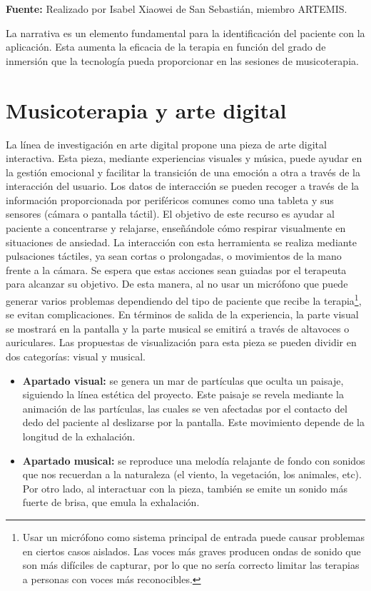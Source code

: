 \begin{center}
	\textbf{Fuente:} Realizado por Isabel Xiaowei de San Sebastián, miembro ARTEMIS.
\end{center}

La narrativa es un elemento fundamental para la identificación del paciente con la aplicación. Esta aumenta la eficacia de la terapia en función del grado de inmersión que la tecnología pueda proporcionar en las sesiones de musicoterapia.

\section{Musicoterapia y arte digital}

La línea de investigación en arte digital propone una pieza de arte digital interactiva. Esta pieza, mediante experiencias visuales y música, puede ayudar en la gestión emocional y facilitar la transición de una emoción a otra a través de la interacción del usuario. Los datos de interacción se pueden recoger a través de la información proporcionada por periféricos comunes como una tableta y sus sensores (cámara o pantalla táctil). El objetivo de este recurso es ayudar al paciente a concentrarse y relajarse, enseñándole cómo respirar visualmente en situaciones de ansiedad. La interacción con esta herramienta se realiza mediante pulsaciones táctiles, ya sean cortas o prolongadas, o movimientos de la mano frente a la cámara. Se espera que estas acciones sean guiadas por el terapeuta para alcanzar su objetivo. De esta manera, al no usar un micrófono que puede generar varios problemas dependiendo del tipo de paciente que recibe la terapia\footnote{Usar un micrófono como sistema principal de entrada puede causar problemas en ciertos casos aislados. Las voces más graves producen ondas de sonido que son más difíciles de capturar, por lo que no sería correcto limitar las terapias a personas con voces más reconocibles.}, se evitan complicaciones. En términos de salida de la experiencia, la parte visual se mostrará en la pantalla y la parte musical se emitirá a través de altavoces o auriculares. Las propuestas de visualización para esta pieza se pueden dividir en dos categorías: visual y musical.

\begin{itemize}
	\item \textbf{Apartado visual:} se genera un mar de partículas que oculta un paisaje, siguiendo la línea estética del proyecto. Este paisaje se revela mediante la animación de las partículas, las cuales se ven afectadas por el contacto del dedo del paciente al deslizarse por la pantalla. Este movimiento depende de la longitud de la exhalación.
	\item \textbf{Apartado musical:} se reproduce una melodía relajante de fondo con sonidos que nos recuerdan a la naturaleza (el viento, la vegetación, los animales, etc). Por otro lado, al interactuar con la pieza, también se emite un sonido más fuerte de brisa, que emula la exhalación.
\end{itemize}



